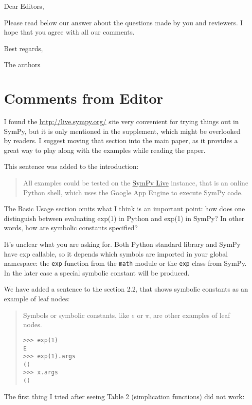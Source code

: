\documentclass[answers,12pt]{exam}
\begin{document}
Dear Editors, \bigskip

Please read below our answer about the
questions made by you and reviewers. I hope that you agree
with all our comments. \bigskip

Best regards,\bigskip

The authors

\pagebreak

\section{Comments from Editor}

\begin{questions}
\question I found the \url{http://live.sympy.org/} site very convenient for trying things
out in SymPy, but it is only mentioned in the supplement, which might be
overlooked by readers. I suggest moving that section into the main paper, as
it provides a great way to play along with the examples while reading the
paper.
\begin{solution}
This sentence was added to the introduction:
\begin{quote}
All examples could be tested on the \href{http://live.sympy.org}{SymPy
Live} instance, that is an online Python shell, which uses the Google
App Engine to execute SymPy code.
\end{quote}
\end{solution}
\question The Basic Usage section omits what I think is an important point:
how does one distinguish between evaluating exp(1) in Python and exp(1) in
SymPy? In other words, how are symbolic constants specified?
\begin{solution}
It's unclear what you are asking for.  Both Python standard library
and SymPy have exp callable, so it depends which symbols are
imported in your global namespace: the \texttt{exp} function from the \texttt{math}
module or the \texttt{exp} class from SymPy.  In the later case a special
symbolic constant will be produced.

We have added a sentence to the section 2.2, that shows symbolic
constants as an example of leaf nodes:
\begin{quote}
Symbols or symbolic constants, like $e$ or $\pi$, are other examples of
leaf nodes.
\begin{verbatim}
>>> exp(1)
E
>>> exp(1).args
()
>>> x.args
()
\end{verbatim}
\end{quote}
\end{solution}
\question The first
thing I tried after seeing Table 2 (simplication functions) did not work:


\end{questions}
\end{document}
